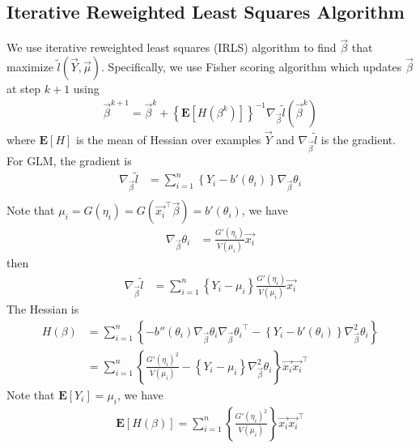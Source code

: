 \subsection{Iterative Reweighted Least Squares Algorithm}
We use iterative reweighted least squares (IRLS) algorithm to find $\vec{\beta}$ that maximize $\tilde{l}(\vec{Y},\vec{\mu})$. Specifically, we use Fisher scoring algorithm which updates $\vec{\beta}$ at step $k+1$ using
\begin{align*}
\vec{\beta}^{k+1} = \vec{\beta}^{k} + \left\{\mathbf{E}[H(\beta^{k})]\right\}^{-1} \nabla_{\vec{\beta}}\tilde{l}(\vec{\beta}^{k})
\end{align*}
where $\mathbf{E}[H]$ is the mean of Hessian over examples $\vec{Y}$ and $\nabla_{\vec{\beta}}\tilde{l}$ is the gradient.
For GLM, the gradient is
\begin{align*}
\nabla_{\vec{\beta}}\tilde{l} &= \sum_{i = 1}^{n}\left\{Y_i - b'(\theta_{i})\right\}\nabla_{\vec{\beta}}\theta_{i} \\
\end{align*}
Note that $\mu_{i} = G(\eta_{i}) = G(\vec{x_i}^\top \vec{\beta}) = b'(\theta_{i})$, we have
\begin{align*}
\nabla_{\vec{\beta}}\theta_{i} &= \frac{G'(\eta_{i})}{V(\mu_{i})} \vec{x_i}
\end{align*}
then
\begin{align*}
\nabla_{\vec{\beta}}\tilde{l} &= \sum_{i = 1}^{n}\left\{Y_i - \mu_{i}\right\}\frac{G'(\eta_{i})}{V(\mu_{i})}\vec{x_i}
\end{align*}
The Hessian is
\begin{align*}
H(\beta) &= \sum_{i = 1}^{n} \left\{-b''(\theta_{i}) \nabla_{\vec{\beta}}\theta_{i} {\nabla_{\vec{\beta}}\theta_{i}}^\top - \left\{Y_i - b'(\theta_{i})\right\}\nabla_{\vec{\beta}}^2 \theta_{i}\right\} \\
& = \sum_{i = 1}^{n} \left\{ \frac{G'(\eta_{i})^2}{V(\mu_{i})} - \left\{Y_i - \mu_{i}\right\}\nabla_{\vec{\beta}}^2 \theta_{i}\right\}\vec{x_i} \vec{x_i}^\top
\end{align*}
Note that $\mathbf{E}[Y_i] = \mu_{i}$, we have
\begin{align*}
\mathbf{E}[H(\beta)] = \sum_{i = 1}^{n} \left\{\frac{G'(\eta_{i})^2}{V(\mu_{i})}\right\}\vec{x_i} \vec{x_i}^\top
\end{align*}
